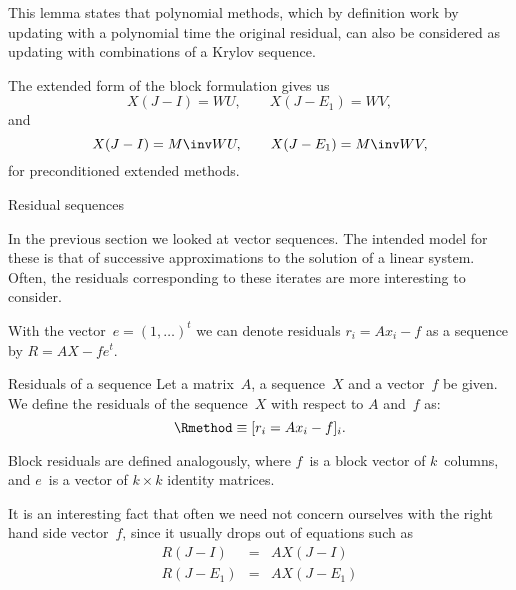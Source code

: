 This lemma states that polynomial methods, which by definition work by
updating with a polynomial time the original residual, can also be
considered as updating with combinations of a Krylov sequence.

\begin{extended}
The extended form of the block formulation gives us
\[ X(J-I)=WU,\qquad X(J-E_1)=WV, \]
and 
\[ X(J-I)=M\inv WU,\qquad X(J-E_1)=M\inv WV, \]
for preconditioned extended methods.
\end{extended}

 {Residual sequences}

In the previous section we looked at vector sequences.
The intended model for these is that of
successive approximations to the solution of a linear system.
Often, the residuals corresponding to these iterates are more
interesting to consider.

With the vector~$e=(1,\ldots)^t$ we
can denote residuals $r_i=Ax_i-f$ as a sequence 
by $R=AX-fe^t$. 

\begin{ddefinition}{Residuals of a sequence}
\label{def:residual}
Let a matrix~$A$, a sequence~$X$ and a vector~$f$
be given. We define the residuals of the sequence~$X$
with respect to $A$ and~$f$ as:
\[ \Rmethod\equiv [r_i=Ax_i-f]_i. \]
\end{ddefinition}

\begin{block}
Block residuals are defined analogously, where $f$~is
a block vector of $k$~columns, and $e$~is a vector of $k\times k$
identity matrices.
\end{block}

It is an interesting fact that often we need not concern ourselves with the
right hand side vector~$f$, since it usually drops out of equations
such as
\begin{eqnarray*}
R(J-I)&=&AX(J-I)\\ R(J-E_1)&=&AX(J-E_1) \end{eqnarray*}

